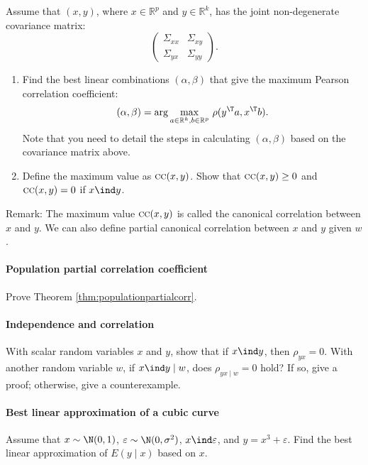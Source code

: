 Assume that $(x,y)$, where $x \in \mathbb{R}^p$ and $y \in \mathbb{R}^k$, has the joint non-degenerate covariance matrix:
$$
\begin{pmatrix}
\Sigma_{xx} & \Sigma_{xy} \\
\Sigma_{yx} & \Sigma_{yy}
\end{pmatrix}. 
$$
\begin{enumerate}
\item
Find the best linear combinations $(\alpha, \beta)$ that
give the maximum Pearson correlation coefficient:
\[
(\alpha, \beta) = 
\text{\ensuremath{\arg\max_{a \in \mathbb{R}^k ,  b \in \mathbb{R}^p}}}\ \rho(y^{\T}a,x^{\T}b).
\]
Note that you need to detail the steps in calculating $(\alpha, \beta)$ based on the covariance matrix above.

\item
Define the maximum value as $\textsc{cc}(x,y)$. Show that $\textsc{cc}(x,y) \geq 0$ and $\textsc{cc}(x,y) = 0$ if $x\ind y$. 
\end{enumerate}

Remark: The maximum value $\textsc{cc}(x,y)$ is called the canonical correlation between $x$ and $y$. 
We can also define partial canonical correlation between $x$ and $y$ given $w$.

\paragraph{Population partial correlation coefficient}\label{hw11::population-partial-correlation}

Prove Theorem \ref{thm:populationpartialcorr}. 

\paragraph{Independence and correlation}\label{hw11::independence-correlation}

With scalar random variables $x$ and $y$, show that if $x\ind y$, then $\rho_{yx}=0$.
With another random variable $w$, if $x\ind y\mid w$, does $\rho_{yx\mid w}=0$
hold? If so, give a proof; otherwise, give a counterexample. 




\paragraph{Best linear approximation of a cubic curve}\label{hw11::bestlinear-cubic}

Assume that $x\sim\N(0,1)$, $\varepsilon\sim\N(0,\sigma^{2})$, $x\ind\varepsilon$,
and $y=x^{3}+\varepsilon$. Find the best linear approximation of
$E(y\mid x)$ based on $x$. 

